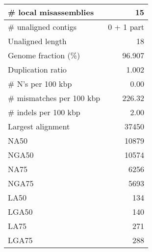 \documentclass[12pt,a4paper]{article}
\begin{document}
\begin{table}[ht]
\begin{center}
\begin{tabular}{|l*{1}{|r}|}
\# local misassemblies & 15 \\ \hline
\# unaligned contigs & 0 + 1 part \\ \hline
Unaligned length & 18 \\ \hline
Genome fraction (\%) & 96.907 \\ \hline
Duplication ratio & 1.002 \\ \hline
\# N's per 100 kbp & 0.00 \\ \hline
\# mismatches per 100 kbp & 226.32 \\ \hline
\# indels per 100 kbp & 2.00 \\ \hline
Largest alignment & 37450 \\ \hline
NA50 & 10879 \\ \hline
NGA50 & 10574 \\ \hline
NA75 & 6256 \\ \hline
NGA75 & 5693 \\ \hline
LA50 & 134 \\ \hline
LGA50 & 140 \\ \hline
LA75 & 271 \\ \hline
LGA75 & 288 \\ \hline
\end{tabular}
\end{center}
\end{table}
\end{document}
